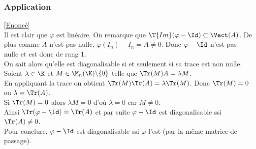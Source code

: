 \documentclass[8pt]{book}
\begin{document}
	\subsubsection{Application }
	\label{Application corrigé}
	\textcolor{blue}{\hyperref[Application]{[Enoncé]}}\\
	Il est clair que $\varphi$ est linéaire. On remarque que $\T{Im}(\varphi-\Id)\subset\Vect(A)$. De plus comme $A$ n'est pas nulle, $\varphi(I_n)-I_n=A\ne 0$. Donc $\varphi-\Id$ n'est pas nulle et est donc de rang $1$.\\
	On sait alors qu'elle est diagonalisable si et seulement si sa trace est non nulle.\\
	Soient $\lambda\in \K$ et $M\in \M_n(\K)\backslash\{0\}$ telle que $\Tr(M)A=\lambda M$.\\
	En appliquant la trace on obtient $\Tr(M)\Tr(A)=\lambda\Tr(M)$. Donc $\Tr(M)=0$ ou $\lambda=\Tr(A)$.\\
	Si $\Tr(M)=0$ alors $\lambda M=0$ d'où $\lambda=0$ car $M\ne 0$.\\
	Ainsi $\Tr(\varphi-\Id)=\Tr(A)$ et par suite $\varphi-\Id$ est diagonalisable ssi $\Tr(A)\ne 0$.\\
	Pour conclure, $\varphi-\Id$ est diagonalisable ssi $\varphi$ l'est (par la même matrice de passage).
	
\end{document}
